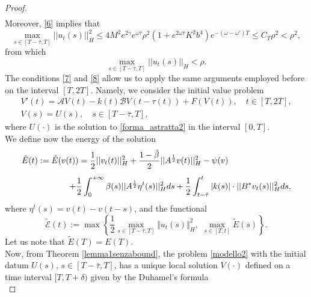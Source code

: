 \documentclass[11pt]{article}
\renewcommand{\leq}{\leqslant}
\begin{document}
\begin{proof}
\begin{equation}
\begin{array}{l}
	\end{array}
\end{equation}
Moreover, \eqref{6} implies that
$$\max_{s\in [T-\bar{\tau},T]}||u_t(s)||_H^2\leq 4 M^2e^{2\gamma}e^{\omega\bar{\tau}}\rho^2 \left(1+e^{2\omega\bar{\tau}}K^2b^4\right)e^{-(\omega-\omega')T}\leq C_T\rho^2<\rho^2,$$
from which 
\begin{equation}\label{8}
	\max_{s\in [T-\bar{\tau},T]}||u_t(s)||_H<\rho.
\end{equation}
The conditions \eqref{7} and \eqref{8} allow us to apply the same arguments employed before on the interval $[T,2T]$. Namely, we consider  the initial value problem
\begin{equation}\label{modello2}
	\begin{array}{l}
		\displaystyle{V'(t)=\mathcal{A}V(t)-k(t)\mathcal{B}V(t-\tau(t))+F(V(t)),\quad t\in [T,2T],}\\
		\displaystyle{V(s)=U(s),\quad s\in [T-\bar{\tau},T],}
	\end{array}
\end{equation}
where $U(\cdot)$ is the solution to \eqref{forma_astratta2} in the interval $[0,T]$.
\\We define now the energy of the solution
\begin{equation}\label{energy}
	\begin{array}{l}
		\vspace{0.3cm}\displaystyle{\tilde{E}(t):=\tilde{E} (v(t))=\frac{1}{2}||v_t(t)||_H^2+\frac{1-\tilde{\beta}}{2}||A^{\frac 12}v(t)||^2_H-\psi(v)  }\\ \hspace{2 cm}
		\displaystyle{ +\frac{1}{2}\int_0^{+\infty} \beta(s) ||A^{\frac 1 2} \eta^t(s)||^2_H ds +\frac{1}{2}\int_{t-\bar\tau}^t |k(s)|\cdot ||B^*v_t(s)||_H^2 ds,}
	\end{array}
\end{equation}
where $\eta^t(s)=v(t)-v(t-s)$, and the functional
\begin{equation}\label{funzionale}
	\tilde{\mathcal{E}}(t):=\max\left\{\frac{1}{2}\max_{s\in [T-\bar{\tau},T]}\Vert u_t(s)\Vert_H^2,\,\,\max_{s\in[T,t]}\tilde{E}(s)\right\}.
\end{equation}
Let us note that $\tilde{E}(T)=E(T)$. 
\\Now, from Theorem \ref{lemma1senzabound}, the problem \eqref{modello2} with the initial datum $U(s)$, $s\in [T-\bar\tau,T]$, has a unique local solution $V(\cdot)$ defined on a time interval $[T,T+\delta)$ given by the Duhamel's formula
\begin{equation}\label{secondasol}

\end{equation}
\end{proof}
\end{document}
